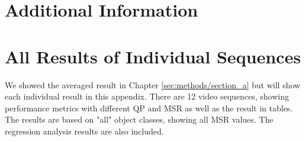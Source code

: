 \chapter{Additional Information}


\newpage

\newpage

\newpage

\newpage

\newpage

\chapter{All Results of Individual Sequences}
We showed the averaged result in Chapter \ref{sec:methods/section_a} but will show each individual result in this appendix. There are 12 video sequences, showing performance metrics with different QP and MSR as well as the result in tables. The results are based on "all" object classes, showing all MSR values. The regression analysis results are also included. 

\newpage

\newpage

\newpage

\newpage

\newpage

\newpage

\newpage

\newpage

\newpage

\newpage

\newpage

\newpage






